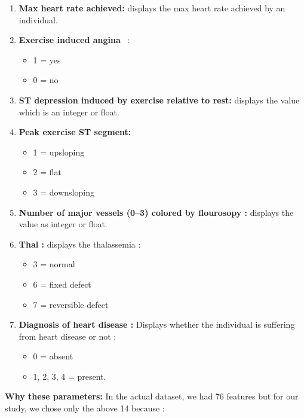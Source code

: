 \documentclass[oneside,12pt]{Classes/VTU}
\begin{document}
\begin{enumerate}
  	\item \textbf{Max heart rate achieved:} displays the max heart rate achieved by an individual.
  	\item \textbf{Exercise induced angina\tiny\textcolor{white}{s}\normalsize} :
	  	\begin{itemize}
  			\item 1 = yes
  			\item 0 = no
  		\end{itemize}
  	
  	\item \textbf{ST depression induced by exercise relative to rest:} displays the value which is an integer or float.
  	
  	\item \textbf{Peak exercise ST segment:}
  		\begin{itemize}
	  		\item 1 = upsloping
  			\item 2 = flat
  			\item 3 = downsloping
 	 	\end{itemize}
  	
  	\item \textbf{Number of major vessels (0–3) colored by flourosopy :} displays the value as integer or float.
  	
  	\item \textbf{Thal :} displays the thalassemia :
  		\begin{itemize}
  			\item 3 = normal
  			\item 6 = fixed defect
  			\item 7 = reversible defect
  		\end{itemize}
  	
  	\item \textbf{Diagnosis of heart disease :} Displays whether the individual is suffering from heart disease or not :
  	\begin{itemize}
  		\item 0 = absent
  		\item 1, 2, 3, 4 = present.
  	\end{itemize}
  	
  \end{enumerate}

	\textbf{Why these parameters:}
	In the actual dataset, we had 76 features but for our study, we chose only the above 14 because :
	
\end{document}
